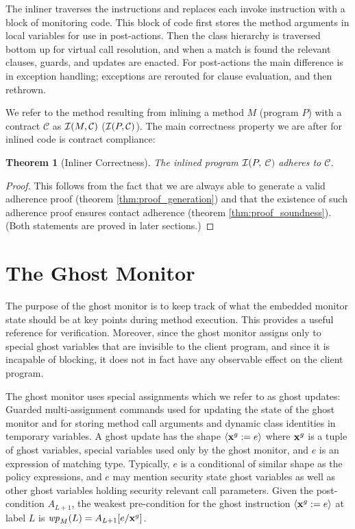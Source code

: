 \documentclass[10pt,twocolumn]{article}
\newtheorem{theorem}{Theorem}
\newcommand{\WP}{{\it wp}}
\newcommand{\ghost}[1]{{\it #1}^g}
\newcommand{\Contract}{\mathcal{C}}
\newcommand{\Inline}{{\cal I}}
\begin{document}
The inliner traverses the instructions and replaces each invoke instruction with a block of monitoring code. This block of code first stores the method arguments in local variables for use in post-actions. Then the class hierarchy is traversed bottom up for virtual call resolution, and when a match is found the relevant clauses, guards, and updates are enacted. For post-actions the main difference is in exception handling; exceptions are rerouted for clause evaluation, and then rethrown.

We refer to the method resulting from inlining a method $M$ (program $P$) with a contract $\Contract$ as $\Inline(M,\Contract)$ ($\Inline(P,\Contract)$). The main correctness property we are after for inlined code is contract compliance:
\begin{theorem}[Inliner Correctness]
The inlined program $\Inline(P,$ ${\Contract})$ adheres to $\Contract$.
\end{theorem}
\begin{proof}
This follows from the fact that we are always able to generate a valid adherence proof (theorem \ref{thm:proof_generation}) and that the existence of such adherence proof ensures contact adherence (theorem \ref{thm:proof_soundness}). (Both statements are proved in later sections.)
\end{proof}


\section{The Ghost Monitor}
The purpose of the ghost monitor is to keep track of what the embedded
monitor state should be at key points during method execution. This provides
a useful reference for verification. Moreover, since the ghost monitor assigns only to 
special ghost variables that are invisible to the client program, and
since it is incapable of blocking, it does not in fact
have any observable effect on the client program.

The ghost monitor uses
special assignments which we refer to as ghost updates: Guarded multi-assignment 
commands used for updating the state of the ghost monitor and for 
storing method call 
arguments and dynamic class identities in temporary variables.
A ghost update has the 
shape $\langle {\bf x}^g := e\rangle $ where ${\bf x}^g$ is a tuple of 
ghost variables, special variables used only by the ghost monitor, and 
$e$ is an expression of matching type. Typically, 
$e$ is a conditional of similar shape as the policy expressions, and 
$e$ may mention security state ghost variables as well as other ghost 
variables holding security relevant call parameters. Given the 
post-condition $A_{L+1}$, the weakest pre-condition for the ghost 
instruction $\langle \ghost{{\bf x}} := e\rangle $ at label $L$ is 
$\WP_M(L)=A_{L+1}[e/\ghost{{\bf x}}]$.
\end{document}
